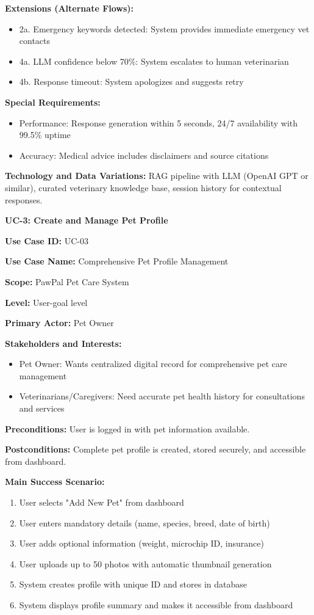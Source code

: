 \textbf{Extensions (Alternate Flows):}
\begin{itemize}
    \item 2a. Emergency keywords detected: System provides immediate emergency vet contacts
    \item 4a. LLM confidence below 70\%: System escalates to human veterinarian
    \item 4b. Response timeout: System apologizes and suggests retry
\end{itemize}

\textbf{Special Requirements:}
\begin{itemize}
    \item Performance: Response generation within 5 seconds, 24/7 availability with 99.5\% uptime
    \item Accuracy: Medical advice includes disclaimers and source citations
\end{itemize}

\textbf{Technology and Data Variations:} RAG pipeline with LLM (OpenAI GPT or similar), curated veterinary knowledge base, session history for contextual responses.

\textbf{UC-3: Create and Manage Pet Profile}

\textbf{Use Case ID:} UC-03

\textbf{Use Case Name:} Comprehensive Pet Profile Management

\textbf{Scope:} PawPal Pet Care System

\textbf{Level:} User-goal level

\textbf{Primary Actor:} Pet Owner

\textbf{Stakeholders and Interests:}
\begin{itemize}
    \item Pet Owner: Wants centralized digital record for comprehensive pet care management
    \item Veterinarians/Caregivers: Need accurate pet health history for consultations and services
\end{itemize}

\textbf{Preconditions:} User is logged in with pet information available.

\textbf{Postconditions:} Complete pet profile is created, stored securely, and accessible from dashboard.

\textbf{Main Success Scenario:}
\begin{enumerate}
    \item User selects "Add New Pet" from dashboard
    \item User enters mandatory details (name, species, breed, date of birth)
    \item User adds optional information (weight, microchip ID, insurance)
    \item User uploads up to 50 photos with automatic thumbnail generation
    \item System creates profile with unique ID and stores in database
    \item System displays profile summary and makes it accessible from dashboard
\end{enumerate}

